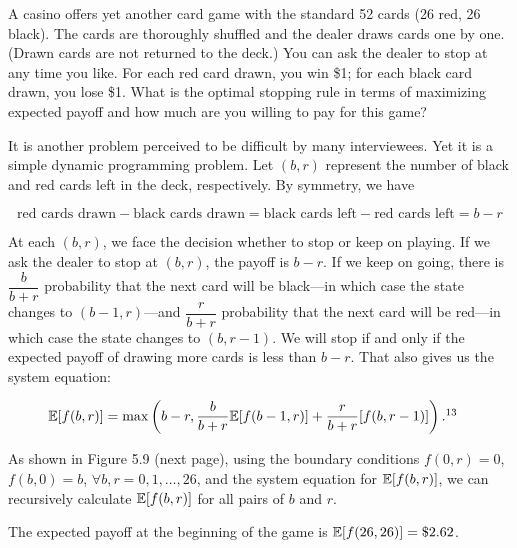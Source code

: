 \begin{problem}{A casino offers yet another card game with the standard 52 cards (26 red, 26 black). The
cards are thoroughly shuffled and the dealer draws cards one by one. (Drawn cards are
not returned to the deck.) You can ask the dealer to stop at any time you like. For each
red card drawn, you win \$1; for each black card drawn, you lose \$1. What is the optimal
stopping rule in terms of maximizing expected payoff and how much are you willing to
pay for this game?}
\end{problem}

\begin{solution}
It is another problem perceived to be difficult by many interviewees. Yet it is a simple
dynamic programming problem. Let $(b,r)$ represent the number of black and red cards left
in the deck, respectively. By symmetry, we have

\[
\text{red cards drawn}-\text{black cards drawn}
=\text{black cards left}-\text{red cards left}=b-r
\]

At each $(b,r)$, we face the decision whether to stop or keep on playing. If we ask the
dealer to stop at $(b,r)$, the payoff is $b-r$. If we keep on going, there is
$\dfrac{b}{b+r}$ probability that the next card will be black---in which case the state
changes to $(b-1,r)$---and $\dfrac{r}{b+r}$ probability that the next card will be
red---in which case the state changes to $(b,r-1)$. We will stop if and only if the
expected payoff of drawing more cards is less than $b-r$. That also gives us the system
equation:

\[
\begin{aligned}
\E[f(b,r)]&=\max\left(b-r,\frac{b}{b+r}\E[f(b-1,r)]+
\frac{r}{b+r}[f(b,r-1)]\right).\footnotemark[13]
\end{aligned}
\]

As shown in Figure 5.9 (next page), using the boundary conditions $f(0,r)=0$,
$f(b,0)=b$, $\forall b,r=0,1,\ldots,26$, and the system equation for $\mathbb{E}[f(b,r)]$, we can
recursively calculate $\mathbb{E}[f(b,r)]$ for all pairs of $b$ and $r$.

The expected payoff at the beginning of the game is $\mathbb{E}[f(26,26)]=\$2.62$.\qedhere



\end{solution}
